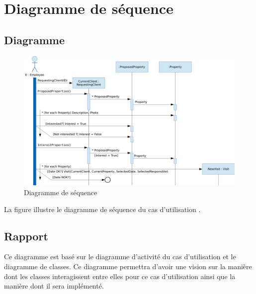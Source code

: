 \chapter{Diagramme de séquence}

\section{Diagramme}

\begin{figure}
  \centering
  \includegraphics[scale=0.67,angle=90]{IMG/id}
  \caption{Diagramme de séquence}
  \label{img_id}
\end{figure}

La figure  illustre le diagramme de séquence du cas d'utilisation \selectedusecase{}.

\section{Rapport}

Ce diagramme est basé sur le diagramme d'activité du cas d'utilisation \selectedusecase{} et le diagramme de classes. Ce diagramme permettra d'avoir une vision sur la manière dont les classes interagissent entre elles pour ce cas d'utilisation ainsi que la manière dont il sera implémenté.